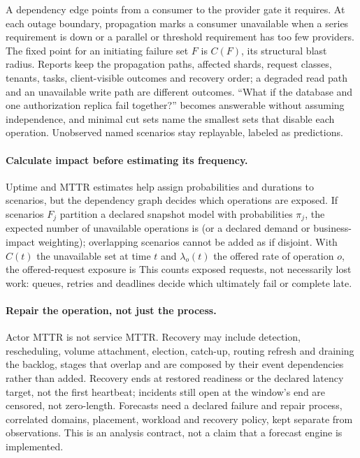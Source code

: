 A dependency edge points from a consumer to the provider gate it requires. At each
outage boundary, propagation marks a consumer unavailable when a series
requirement is down or a parallel or threshold requirement has too few providers.
The fixed point for an initiating failure set $F$ is $C(F)$, its structural blast
radius. Reports keep the propagation paths, affected shards, request classes,
tenants, tasks, client-visible outcomes and recovery order; a degraded read path
and an unavailable write path are different outcomes. ``What if the database and
one authorization replica fail together?'' becomes answerable without assuming
independence, and minimal cut sets name the smallest sets that disable each
operation. Unobserved named scenarios stay replayable, labeled as predictions.

\paragraph{Calculate impact before estimating its frequency.} Uptime and MTTR
estimates help assign probabilities and durations to scenarios, but the dependency
graph decides which operations are exposed. If scenarios $F_j$ partition a declared
snapshot model with probabilities $\pi_j$, the expected number of unavailable
operations is
(or a declared demand or business-impact weighting); overlapping scenarios cannot
be added as if disjoint. With $C(t)$ the unavailable set at time $t$ and
$\lambda_o(t)$ the offered rate of operation $o$, the offered-request exposure is
This counts exposed requests, not necessarily lost work: queues, retries and
deadlines decide which ultimately fail or complete late.

\paragraph{Repair the operation, not just the process.} Actor MTTR is not service
MTTR. Recovery may include detection, rescheduling, volume attachment, election,
catch-up, routing refresh and draining the backlog, stages that overlap and are
composed by their event dependencies rather than added. Recovery ends at restored
readiness or the declared latency target, not the first heartbeat; incidents still
open at the window's end are censored, not zero-length. Forecasts need a declared
failure and repair process, correlated domains, placement, workload and recovery
policy, kept separate from observations. This is an analysis contract, not a
claim that a forecast engine is implemented.

